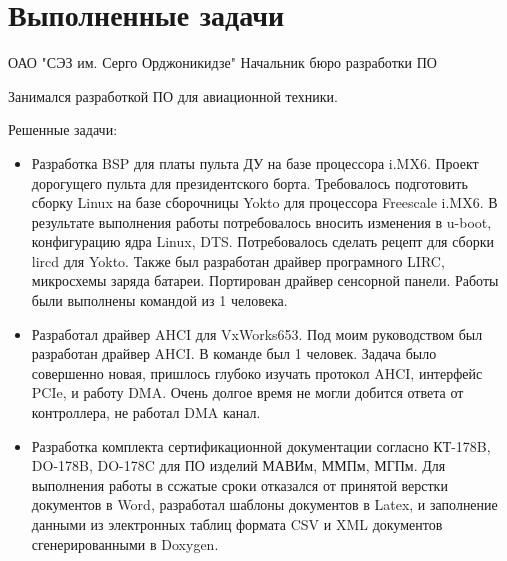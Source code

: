 \section{Выполненные задачи}

\jobdetail
{ОАО "СЭЗ им. Серго Орджоникидзе"}
{Начальник бюро разработки ПО}
{Занимался разработкой ПО для авиационной техники.

Решенные задачи:
\begin{itemize}
\item{Разработка BSP для платы пульта ДУ на базе процессора i.MX6. Проект дорогущего пульта для президентского борта. Требовалось подготовить сборку Linux на базе сборочницы Yokto для процессора Freescale i.MX6. В результате выполнения работы потребовалось вносить изменения в u-boot, конфигурацию ядра Linux, DTS. Потребовалось сделать рецепт для сборки lircd для Yokto. Также был разработан драйвер програмного LIRC, микросхемы заряда батареи. Портирован драйвер сенсорной панели. Работы были выполнены командой из 1 человека.}
\item{Разработал драйвер AHCI для VxWorks653. Под моим руководством был разработан драйвер AHCI. В команде был 1 человек. Задача было совершенно новая, пришлось глубоко изучать протокол AHCI, интерфейс PCIe, и работу DMA. Очень долгое время не могли добится ответа от контроллера, не работал DMA канал.}
\item{Разработка комплекта сертификационной документации согласно КТ-178B, DO-178B, DO-178C для ПО изделий МАВИм, ММПм, МГПм. Для выполнения работы в ссжатые сроки отказался от принятой верстки документов в Word, разработал шаблоны документов в Latex, и заполнение данными из электронных таблиц формата CSV и XML документов сгенерированными в Doxygen.}
\end{itemize}
}


